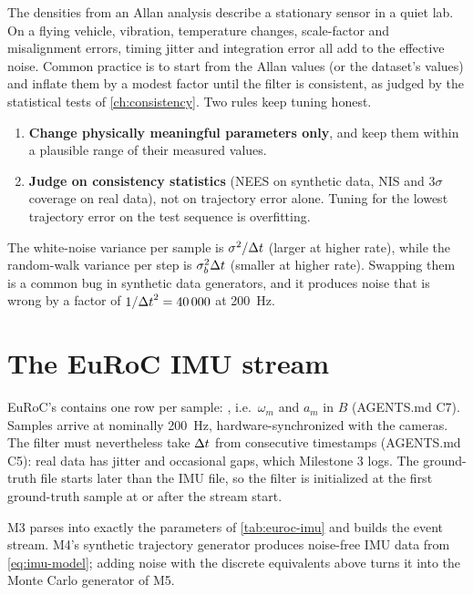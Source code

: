 The densities from an Allan analysis describe a stationary sensor in a quiet lab. On a flying vehicle, vibration, temperature changes, scale-factor and
misalignment errors, timing jitter and integration error all add to the effective noise. Common practice is to start from the Allan values (or the
dataset's values) and inflate them by a modest factor until the filter is consistent, as judged by the statistical tests of \cref{ch:consistency}. Two
rules keep tuning honest.
\begin{enumerate}
  \item \textbf{Change physically meaningful parameters only}, and keep them within a plausible range of their measured values.
  \item \textbf{Judge on consistency statistics} (NEES on synthetic data, NIS and $3\sigma$ coverage on real data), not on trajectory error alone. Tuning for
        the lowest trajectory error on the test sequence is overfitting.
\end{enumerate}

\begin{pitfall}
The white-noise variance per sample is $\sigma^2/{\Delta t}$ (larger at higher rate), while the random-walk variance per step is $\sigma_b^2{\Delta t}$ (smaller at higher rate).
Swapping them is a common bug in synthetic data generators, and it produces noise that is wrong by a factor of $1/{\Delta t}^2 = 40\,000$ at 200~Hz.
\end{pitfall}

\section{The EuRoC IMU stream}

EuRoC's  contains one row per sample: , i.e.\ $\omega_m$
and $a_m$ in $B$ (AGENTS.md C7). Samples arrive at nominally 200~Hz, hardware-synchronized with the cameras. The filter must nevertheless take ${\Delta t}$ from
consecutive timestamps (AGENTS.md C5): real data has jitter and occasional gaps, which Milestone 3 logs. The ground-truth file starts later than the IMU
file, so the filter is initialized at the first ground-truth sample at or after the stream start.

\begin{projectlink}
M3 parses  into exactly the parameters of \cref{tab:euroc-imu} and builds the event stream. M4's synthetic trajectory generator produces
noise-free IMU data from \eqref{eq:imu-model}; adding noise with the discrete equivalents above turns it into the Monte Carlo generator of M5.
\end{projectlink}

